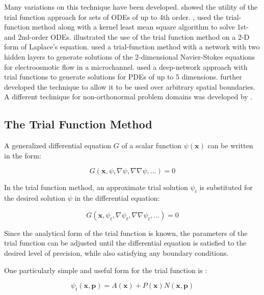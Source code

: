 \documentclass{article}
\begin{document}
Many variations on this technique have been developed. \cite{Malek2006} showed the utility of the trial function approach for sets of ODEs of up to 4th order. \cite{Yazdi2011a}, \cite{Yazdi2011b} used the trial-function method along with a kernel least mean square algorithm to solve 1st- and 2nd-order ODEs. \cite{Chiaramonte2013} illustrated the use of the trial function method on a 2-D form of Laplace's equation. \cite{Baymani2014} used a trial-function method with a network with two hidden layers to generate solutions of the 2-dimensional Navier-Stokes equations for electroosmotic flow in a microchannel. \cite{Avrutskiy2020} used a deep-network approach with trial functions to generate solutions for PDEs of up to 5 dimensions. \cite{Berg2018} further developed the technique to allow it to be used over arbitrary spatial boundaries. A different technique for non-orthonormal problem domains was developed by \cite{McFall2009}.

\subsection{The Trial Function Method}

A generalized differential equation $G$ of a scalar function $\psi(\mathbf x)$ can be written in the form:

\begin{equation}
  G(\mathbf x, \psi, \nabla \psi, \nabla \nabla \psi, ...) = 0
\end{equation}

In the trial function method, an approximate trial solution $\psi_t$ is substituted for the desired solution $\psi$ in the differential equation:

\begin{equation}
  G(\mathbf x, \psi_t, \nabla \psi_t, \nabla \nabla \psi_t, ...) = 0
\end{equation}

\noindent Since the analytical form of the trial function is known, the parameters of the trial function can be adjusted until the differential equation is satisfied to the desired level of precision, while also satisfying any boundary conditions.

One particularly simple and useful form for the trial function is \cites{Lagaris1998}:

\begin{equation}
  \psi_t(\mathbf x, \mathbf p) = A(\mathbf x) + P(\mathbf x) N(\mathbf x, \mathbf p)
  \label{eq:trialfunction}
\end{equation}
\end{document}
